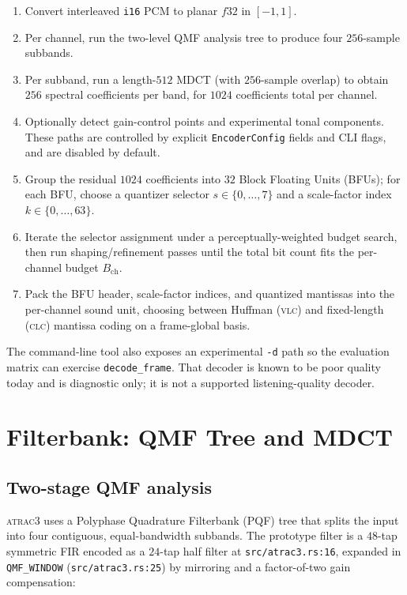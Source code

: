 \documentclass[11pt]{article}
\begin{document}
\begin{enumerate}
\itemsep0pt
\item Convert interleaved \texttt{i16} PCM to planar \(f32\) in \([-1,1]\).
\item Per channel, run the two-level QMF analysis tree to produce four
\(256\)-sample subbands.
\item Per subband, run a length-\(512\) MDCT (with \(256\)-sample overlap)
to obtain \(256\) spectral coefficients per band, for \(1024\) coefficients
total per channel.
\item Optionally detect gain-control points and experimental tonal
components. These paths are controlled by explicit \texttt{EncoderConfig}
fields and CLI flags, and are disabled by default.
\item Group the residual \(1024\) coefficients into \(32\) Block Floating
Units (BFUs); for each BFU, choose a quantizer selector
\(s \in \{0,\dots,7\}\) and a scale-factor index \(k \in \{0,\dots,63\}\).
\item Iterate the selector assignment under a perceptually-weighted budget
search, then run shaping/refinement passes until the total bit count fits the
per-channel budget \(B_{\text{ch}}\).
\item Pack the BFU header, scale-factor indices, and quantized mantissas
into the per-channel sound unit, choosing between Huffman (\textsc{vlc}) and
fixed-length (\textsc{clc}) mantissa coding on a frame-global basis.
\end{enumerate}

The command-line tool also exposes an experimental \texttt{-d} path so the
evaluation matrix can exercise \texttt{decode\_frame}. That decoder is known
to be poor quality today and is diagnostic only; it is not a supported
listening-quality decoder.

\section{Filterbank: QMF Tree and MDCT}
\label{sec:filterbank}

\subsection{Two-stage QMF analysis}

\textsc{atrac3} uses a Polyphase Quadrature Filterbank (PQF) tree that
splits the input into four contiguous, equal-bandwidth subbands. The
prototype filter is a \(48\)-tap symmetric FIR encoded as a \(24\)-tap half
filter at \texttt{src/atrac3.rs:16}, expanded in
\texttt{QMF\_WINDOW} (\texttt{src/atrac3.rs:25}) by mirroring and a factor-of-two
gain compensation:
\end{document}
